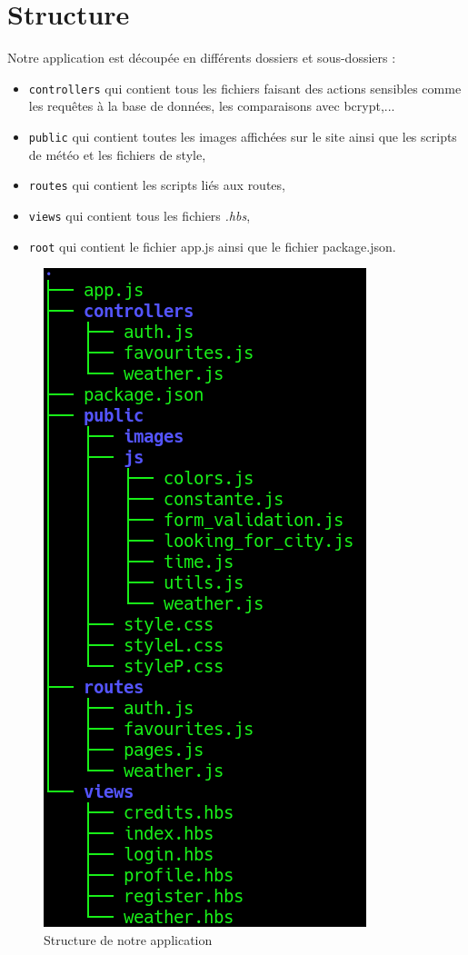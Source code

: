 \documentclass[12pt, french]{article}
\begin{document}
	\section{Structure}
	Notre application est découpée en différents dossiers et sous-dossiers :
	\begin{itemize}
	    \item \texttt{controllers} qui contient tous les fichiers faisant des actions sensibles comme les requêtes à la base de données, les comparaisons avec bcrypt,...
	    \item \texttt{public} qui contient toutes les images affichées sur le site ainsi que les scripts de météo et les fichiers de style,
	    \item \texttt{routes} qui contient les scripts liés aux routes, 
	    \item \texttt{views} qui contient tous les fichiers \textit{.hbs},
	    \item \texttt{root} qui contient le fichier app.js ainsi que le fichier package.json.
	\end{itemize}
	\newpage
	\begin{figure}[!h]
	    \centering
	    \includegraphics[width=.3\linewidth]{images/tree.png}
	    \caption{Structure de notre application}
	    \label{fig:tree}
	\end{figure}

    \newpage
	\printbibliography
	
	\newpage
\end{document}

